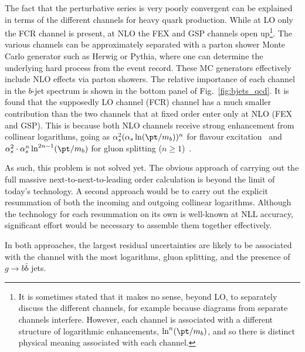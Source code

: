 The fact that the perturbative series is very poorly convergent can be explained in terms of the different channels for heavy quark production. 
While at LO only the FCR channel is present, at NLO the FEX and GSP channels open up\footnote{It is sometimes stated that it makes no sense, beyond LO, to separately discuss the different channels, for example because diagrams from separate channels interfere. However, each channel is associated with a different structure of logarithmic enhancements, $\ln^n (\pt / m_b )$, and so there is distinct physical meaning associated with each channel.}. 
The various channels can be approximately separated with a parton shower Monte Carlo generator such as {\sc Herwig} or {\sc Pythia}, where one can determine the underlying hard process from the event record. These MC generators effectively include NLO effects via parton showers.
The relative importance of each channel in the $b$-jet spectrum is shown in the bottom panel of Fig.~\ref{fig:bjets_qcd}. It is found that the supposedly LO channel (FCR) channel has a much smaller contribution than the two channels that at fixed order enter only at NLO (FEX
and GSP). This is because both NLO channels receive strong enhancement from collinear logarithms, %
going as $\alpha_s^2 (\alpha_s \ln( \pt / m_b))^n$ for flavour excitation~\cite{Altarelli1977298} 
and $\alpha_s^2 \cdot \alpha_s^n \ln^{2n-1}(\pt/m_b)$ for gluon splitting ($n\ge 1$)~\cite{Seymour1995163}.

As such, this problem is not solved yet. The obvious approach of carrying out the full massive next-to-next-to-leading order calculation is beyond the limit of today's technology. A second approach would be to carry out the
explicit resummation of both the incoming and outgoing collinear logarithms. Although the technology for each resummation on its own is well-known at NLL accuracy, significant effort would be necessary to assemble them together effectively. 

In both approaches, the largest residual uncertainties are
likely to be associated with the channel with the most logarithms, gluon splitting, and the presence of 
$g\rightarrow b\bar{b}$ jets. 


